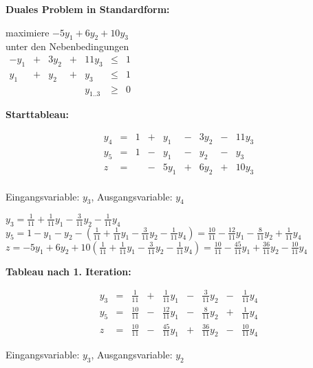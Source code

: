 \documentclass[a4paper,11pt]{article}
\newcommand{\bra}[1]{\left(#1\right)}
\begin{document}
\begin{enumerate}
\begin{enumerate}
        \textbf{Duales Problem in Standardform:}

        maximiere \( - 5y_1 + 6y_2 + 10y_3 \)\\
        unter den Nebenbedingungen \\
        \(\begin{array}{rcrcrcrcr}
            -y_1 & + & 3y_2 & + & 11y_3 & \leq & 1 \\
             y_1 & + &  y_2 & + &   y_3 & \leq & 1 \\
            &&&& y_{1..3} & \geq & 0
        \end{array}\)

        \textbf{Starttableau:}

        \[\begin{array}{rcrcrcrcr}
            y_4 & = & 1 & + &  y_1 & - & 3y_2 & - & 11y_3 \\
            y_5 & = & 1 & - &  y_1 & - &  y_2 & - &   y_3 \\\hline
              z & = &   & - & 5y_1 & + & 6y_2 & + & 10y_3 \\
        \end{array}\]

        Eingangsvariable: $y_3$,
        Ausgangsvariable: $y_4$

        \( y_3 = \frac{1}{11} + \frac{1}{11}y_1 - \frac{3}{11}y_2 - \frac{1}{11}y_4 \) \\
        \( y_5 = 1 - y_1 - y_2 - \bra{ \frac{1}{11} + \frac{1}{11}y_1 - \frac{3}{11}y_2 - \frac{1}{11}y_4 }
            = \frac{10}{11} - \frac{12}{11}y_1 - \frac{8}{11}y_2 + \frac{1}{11}y_4 \) \\
        \( z = -5y_1 + 6y_2 + 10 \bra{ \frac{1}{11} + \frac{1}{11}y_1 - \frac{3}{11}y_2 - \frac{1}{11}y_4 }
            = \frac{10}{11} - \frac{45}{11}y_1 + \frac{36}{11}y_2 - \frac{10}{11}y_4 \)

        \textbf{Tableau nach 1. Iteration:}

        \[\begin{array}{rcrcrcrcr}
            y_3 & = &  \frac{1}{11} & + &  \frac{1}{11}y_1 & - &  \frac{3}{11}y_2 & - &  \frac{1}{11}y_4 \\
            y_5 & = & \frac{10}{11} & - & \frac{12}{11}y_1 & - &  \frac{8}{11}y_2 & + &  \frac{1}{11}y_4 \\\hline
              z & = & \frac{10}{11} & - & \frac{45}{11}y_1 & + & \frac{36}{11}y_2 & - & \frac{10}{11}y_4
        \end{array}\]

        Eingangsvariable: $y_3$,
        Ausgangsvariable: $y_2$


\end{enumerate}
\end{enumerate}
\end{document}
